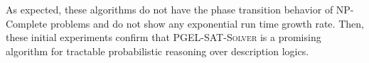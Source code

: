 As expected, these algorithms do not have the phase transition behavior of NP-Complete problems and do not show any exponential run time growth rate. Then, these initial experiments confirm that \textsc{PGEL-SAT-Solver} is a promising algorithm for tractable probabilistic reasoning over description logics.
